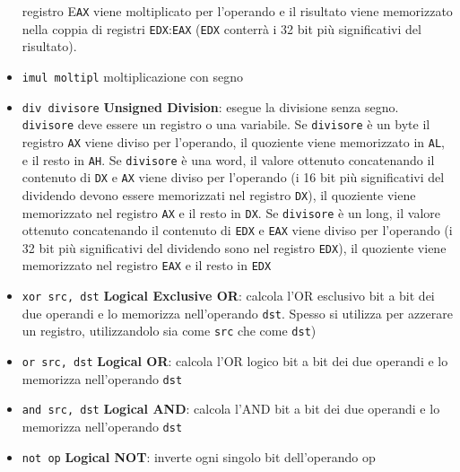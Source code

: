 \documentclass[a4paper]{article}
\theoremstyle{break}
\theoremstyle{break}
\theoremstyle{break}
\theoremstyle{break}
\begin{document}
\begin{itemize}
    registro E\texttt{AX} viene moltiplicato per l'operando e il
    risultato viene memorizzato nella coppia di registri
    \texttt{EDX}:\texttt{EAX} (\texttt{EDX} conterrà i 32 bit più significativi del
    risultato). 
  \item \texttt{imul moltipl} \quad moltiplicazione con segno
  \item \texttt{div divisore} \quad \textbf{Unsigned Division}: 
    esegue la divisione senza segno.
    \texttt{divisore} deve essere un registro o una variabile. Se
    \texttt{divisore} è un byte il registro \texttt{AX} viene diviso per
    l'operando, il quoziente viene memorizzato in \texttt{AL}, e il
    resto in \texttt{AH}. Se \texttt{divisore} è una word, il valore ottenuto
    concatenando il contenuto di \texttt{DX} e \texttt{AX} viene diviso per
    l'operando (i 16 bit più significativi del dividendo
    devono essere memorizzati nel registro \texttt{DX}), il quoziente
    viene memorizzato nel registro \texttt{AX} e il resto in \texttt{DX}. Se
    \texttt{divisore} è un long, il valore ottenuto concatenando il
    contenuto di \texttt{EDX} e \texttt{EAX} viene diviso per l'operando (i
    32 bit più significativi del dividendo sono nel registro
    \texttt{EDX}), il quoziente viene memorizzato nel registro \texttt{EAX}
    e il resto in \texttt{EDX} 
  \item \texttt{xor src, dst} \quad \textbf{Logical Exclusive OR}: calcola l'OR esclusivo bit a bit
    dei due operandi e lo memorizza nell'operando \texttt{dst}.
    Spesso si utilizza per azzerare un registro, utilizzandolo
    sia come \texttt{src} che come \texttt{dst}) 
  \item \texttt{or src, dst} \quad \textbf{Logical OR}: calcola l'OR logico bit a bit dei due
    operandi e lo memorizza nell'operando \texttt{dst}
  \item \texttt{and src, dst} \quad \textbf{Logical AND}: calcola l'AND bit a bit dei due operandi
    e lo memorizza nell'operando \texttt{dst} 
  \item \texttt{not op} \quad \textbf{Logical NOT}: inverte ogni singolo bit dell'operando op 
\end{itemize}
\end{document}
